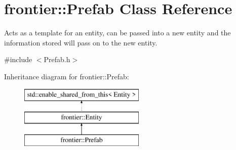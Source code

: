 \hypertarget{classfrontier_1_1_prefab}{}\section{frontier\+:\+:Prefab Class Reference}
\label{classfrontier_1_1_prefab}


Acts as a template for an entity, can be passed into a new entity and the information stored will pass on to the new entity.  




{\ttfamily \#include $<$Prefab.\+h$>$}

Inheritance diagram for frontier\+:\+:Prefab\+:\begin{figure}[H]
\begin{center}
\leavevmode
\includegraphics[height=3.000000cm]{classfrontier_1_1_prefab}
\end{center}
\end{figure}
